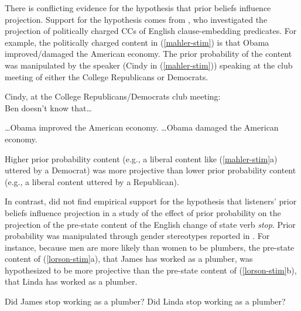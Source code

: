 \documentclass[11pt,fleqn]{article}
\newcommand{\6}{\mbox{$[\hspace*{-.6mm}[$}}
\newcommand{\9}{\mbox{$]\hspace*{-.6mm}]$}}
\begin{document}

There is conflicting evidence for the hypothesis that prior beliefs influence projection. Support for the hypothesis comes from , who investigated the projection of politically charged CCs of 
English clause-embedding predicates. For example, the politically charged content in (\ref{mahler-stim}) is that Obama improved/damaged the American economy. The prior probability of the content was manipulated by the speaker (Cindy in (\ref{mahler-stim})) speaking at the club meeting of either the College Republicans or Democrats.

\begin{exe}
\ex\label{mahler-stim} Cindy, at the College Republicans/Democrats club meeting: \\ Ben doesn't know that\ldots
\begin{xlist}
\ex \ldots Obama improved the American economy.
\ex \ldots Obama damaged the American economy. \hfill \cite[784f.]{mahler2020}
\end{xlist}
\end{exe}
Higher prior probability content (e.g., a liberal content like (\ref{mahler-stim}a) uttered by a Democrat) was more projective than lower prior probability content (e.g., a liberal content uttered by a Republican). 

In contrast,  did not find empirical support for the hypothesis that listeners' prior beliefs influence projection %
in a study of the effect of prior probability on the projection of the pre-state content of the English change of state verb {\em stop}. Prior probability was manipulated through gender stereotypes reported in . For instance, because men are more likely than women to be plumbers, the pre-state content of (\ref{lorson-stim}a), that James has worked as a plumber, was hypothesized to be more projective than the pre-state content of (\ref{lorson-stim}b), that Linda has worked as a plumber.

\begin{exe}
\ex\label{lorson-stim} 
\begin{xlist}
\ex Did James stop working as a plumber?
\ex Did Linda stop working as a plumber? \hfill \cite[38]{lorson2018}
\end{xlist}
\end{exe}
\end{document}
